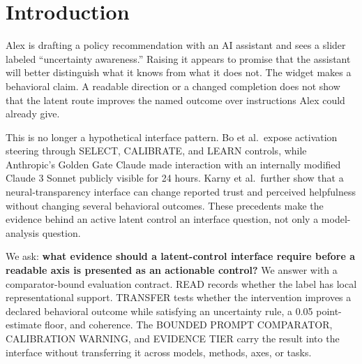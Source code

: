 \documentclass[manuscript,review,anonymous]{acmart}
\begin{document}

\maketitle



\section{Introduction}\label{introduction}

Alex is drafting a policy recommendation with an AI assistant and sees a slider labeled ``uncertainty awareness.'' Raising it appears to promise that the assistant will better distinguish what it knows from what it does not. The widget makes a behavioral claim. A readable direction or a changed completion does not show that the latent route improves the named outcome over instructions Alex could already give.

This is no longer a hypothetical interface pattern. Bo et al.~expose activation steering through SELECT, CALIBRATE, and LEARN controls, while Anthropic's Golden Gate Claude made interaction with an internally modified Claude 3 Sonnet publicly visible for 24 hours. \cite{bo2026steerable,anthropic2024goldengate} {}%
Karny et al.~further show that a neural-transparency interface can change reported trust and perceived helpfulness without changing several behavioral outcomes. \cite{karny2026neural} These precedents make the evidence behind an active latent control an interface question, not only a model-analysis question.

We ask: \textbf{what evidence should a latent-control interface require before a readable axis is presented as an actionable control?} We answer with a comparator-bound evaluation contract. READ records whether the label has local representational support. TRANSFER tests whether the intervention improves a declared behavioral outcome while satisfying an uncertainty rule, a 0.05 point-estimate floor, and coherence. The BOUNDED PROMPT COMPARATOR, CALIBRATION WARNING, and EVIDENCE TIER carry the result into the interface without transferring it across models, methods, axes, or tasks. {}%
{}%
{}%
\end{document}
